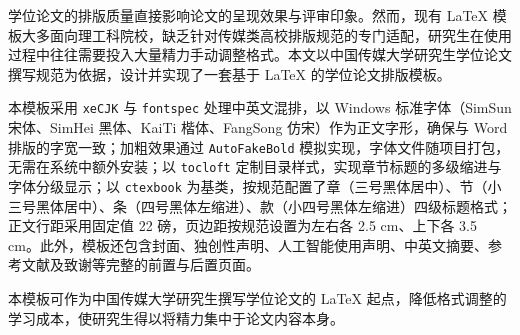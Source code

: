 \begin{cnabstract}
学位论文的排版质量直接影响论文的呈现效果与评审印象。然而，现有 \LaTeX{} 模板大多面向理工科院校，缺乏针对传媒类高校排版规范的专门适配，研究生在使用过程中往往需要投入大量精力手动调整格式。本文以中国传媒大学研究生学位论文撰写规范为依据，设计并实现了一套基于 \LaTeX{} 的学位论文排版模板。

本模板采用 \texttt{xeCJK} 与 \texttt{fontspec} 处理中英文混排，以 Windows 标准字体（SimSun 宋体、SimHei 黑体、KaiTi 楷体、FangSong 仿宋）作为正文字形，确保与 Word 排版的字宽一致；加粗效果通过 \texttt{AutoFakeBold} 模拟实现，字体文件随项目打包，无需在系统中额外安装；以 \texttt{tocloft} 定制目录样式，实现章节标题的多级缩进与字体分级显示；以 \texttt{ctexbook} 为基类，按规范配置了章（三号黑体居中）、节（小三号黑体居中）、条（四号黑体左缩进）、款（小四号黑体左缩进）四级标题格式；正文行距采用固定值 22 磅，页边距按规范设置为左右各 2.5 cm、上下各 3.5 cm。此外，模板还包含封面、独创性声明、人工智能使用声明、中英文摘要、参考文献及致谢等完整的前置与后置页面。

本模板可作为中国传媒大学研究生撰写学位论文的 \LaTeX{} 起点，降低格式调整的学习成本，使研究生得以将精力集中于论文内容本身。
\end{cnabstract}


